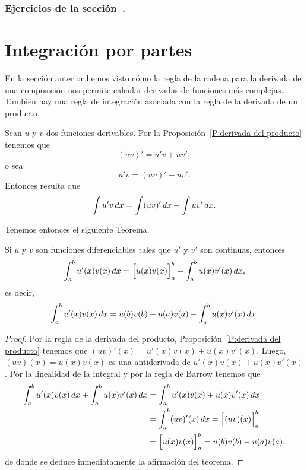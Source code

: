 \subsubsection*{Ejercicios de la sección~.}

\begin{enumerate}
  
\end{enumerate}  

\section{Integración por partes}

En la sección anterior hemos visto cómo la regla de la cadena para la derivada de una composición nos permite calcular derivadas de funciones más complejas.
También hay una regla de integración asociada con la regla de la derivada de un producto.

Sean $u$ y $v$ dos funciones derivables. Por la Proposición~\ref{P:derivada del producto} tenemos que
\[
(uv)'=u'v + u v',
\]
o sea 
\[
  u'v =(uv)'- u v'.
\]
Entonces resulta que 
$$
\int u'v \,dx = \int (uv)' \,dx - \int u v'\,dx.
$$

Tenemos entonces el siguiente Teorema.

\begin{theorem}
  Si $u$ y $v$ son funciones diferenciables tales que $u'$ y $v'$ son continuas, entonces 
  \[
  \int_a^b u'(x)v(x) \,dx = \Big[u(x)v(x)\Big]_a^b - \int_a^b u(x) v'(x)\,dx,
  \]
  es decir,
  \[
  \int_a^b u'(x)v(x) \,dx 
  = u(b)v(b)-u(a)v(a) - \int_a^b u(x) v'(x)\,dx.
  \]
\end{theorem}

\begin{proof}
  Por la regla de la derivada del producto, Proposición~\ref{P:derivada del producto} tenemos que $(uv)'(x)=u'(x)v(x) + u(x) v'(x)$. Luego, $(uv)(x)=u(x)v(x)$ es una antiderivada de $u'(x)v(x) + u(x) v'(x)$. Por la linealidad de la integral y por la regla de Barrow tenemos que
  \begin{align*}
  \int_a^b u'(x)v(x) \,dx+ \int_a^b u(x) v'(x) \,dx
  &=\int_a^b u'(x)v(x) + u(x) v'(x) \,dx
  \\
  &= \int_a^b (uv)'(x)\,dx 
  = \Big[(uv)(x)\Big]_a^b  
  \\
  &= \Big[u(x)v(x)\Big]_a^b  
  = u(b)v(b)-u(a)v(a),
  \end{align*}
  de donde se deduce inmediatamente la afirmación del teorema.
\end{proof}

